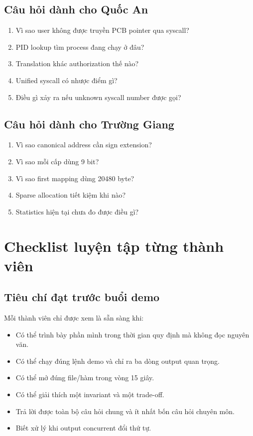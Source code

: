 \documentclass[12pt,a4paper]{article}
\begin{document}
\subsection{Câu hỏi dành cho Quốc An}

\begin{enumerate}
  \item Vì sao user không được truyền PCB pointer qua syscall?
  \item PID lookup tìm process đang chạy ở đâu?
  \item Translation khác authorization thế nào?
  \item Unified syscall có nhược điểm gì?
  \item Điều gì xảy ra nếu unknown syscall number được gọi?
\end{enumerate}

\subsection{Câu hỏi dành cho Trường Giang}

\begin{enumerate}
  \item Vì sao canonical address cần sign extension?
  \item Vì sao mỗi cấp dùng 9 bit?
  \item Vì sao first mapping dùng 20480 byte?
  \item Sparse allocation tiết kiệm khi nào?
  \item Statistics hiện tại chưa đo được điều gì?
\end{enumerate}

\section{Checklist luyện tập từng thành viên}

\subsection{Tiêu chí đạt trước buổi demo}

Mỗi thành viên chỉ được xem là sẵn sàng khi:

\begin{itemize}
  \item Có thể trình bày phần mình trong thời gian quy định mà không đọc nguyên
  văn.
  \item Có thể chạy đúng lệnh demo và chỉ ra ba dòng output quan trọng.
  \item Có thể mở đúng file/hàm trong vòng 15 giây.
  \item Có thể giải thích một invariant và một trade-off.
  \item Trả lời được toàn bộ câu hỏi chung và ít nhất bốn câu hỏi chuyên môn.
  \item Biết xử lý khi output concurrent đổi thứ tự.
\end{itemize}
\end{document}
